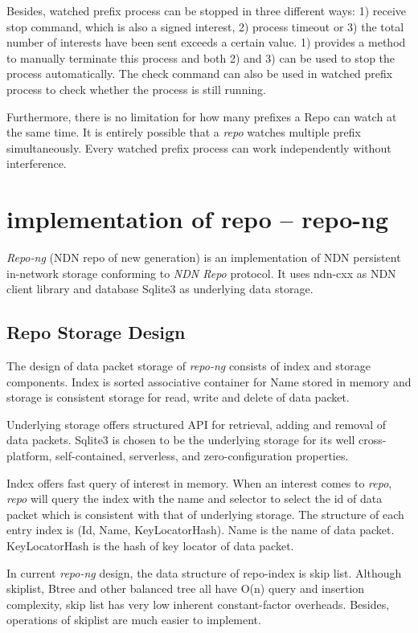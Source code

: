 \documentclass[conference]{IEEEtran}
\begin{document}
Besides, watched prefix process can be stopped in three different ways: 1) receive stop command, which is also a signed interest, 2) process timeout or 3) the total number of interests have been sent exceeds a certain value. 1) provides a method to manually terminate this process and both 2) and 3) can be used to stop the process automatically. The check command can also be used in watched prefix process to check whether the process is still running.

Furthermore, there is no limitation for how many prefixes a Repo can watch at the same time. It is entirely possible that a \emph{repo} watches multiple prefix simultaneously. Every watched prefix process can work independently without interference.

\section{implementation of repo -- repo-ng} \label{section-implementation}
\emph{Repo-ng} (NDN repo of new generation) is an implementation of NDN persistent in-network storage conforming to \emph{NDN Repo} protocol. It uses ndn-cxx as NDN client library and database Sqlite3 as underlying data storage.

\subsection{Repo Storage Design}

The design of data packet storage of \emph{repo-ng} consists of index and storage components. Index is sorted associative container for Name stored in memory and storage is consistent storage for read, write and delete of data packet.

Underlying storage offers structured API for retrieval, adding and removal of data packets. Sqlite3 is chosen to be the underlying storage for its well cross-platform, self-contained, serverless, and zero-configuration properties.

Index offers fast query of interest in memory. When an interest comes to \emph{repo}, \emph{repo} will query the index with the name and selector to select the id of data packet which is consistent with that of underlying storage. The structure of each entry index is (Id, Name, KeyLocatorHash). Name is the name of data packet. KeyLocatorHash is the hash of key locator of data packet.

In current \emph{repo-ng} design, the data structure of repo-index is skip list. Although skiplist, Btree and other balanced tree all have O(n) query and insertion complexity, skip list has very low inherent constant-factor overheads. Besides, operations of skiplist are much easier to implement. \cite{pugh1990skip}
\end{document}
